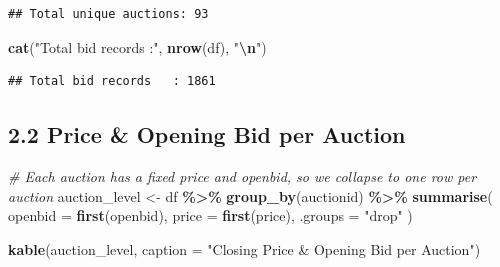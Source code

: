 \documentclass[
]{article}
\newenvironment{Shaded}{\begin{snugshade}}{\end{snugshade}}
\newcommand{\AttributeTok}[1]{\textcolor[rgb]{0.13,0.29,0.53}{#1}}
\newcommand{\CommentTok}[1]{\textcolor[rgb]{0.56,0.35,0.01}{\textit{#1}}}
\newcommand{\FunctionTok}[1]{\textcolor[rgb]{0.13,0.29,0.53}{\textbf{#1}}}
\newcommand{\NormalTok}[1]{#1}
\newcommand{\OtherTok}[1]{\textcolor[rgb]{0.56,0.35,0.01}{#1}}
\newcommand{\SpecialCharTok}[1]{\textcolor[rgb]{0.81,0.36,0.00}{\textbf{#1}}}
\newcommand{\StringTok}[1]{\textcolor[rgb]{0.31,0.60,0.02}{#1}}
\begin{document}
\begin{verbatim}
## Total unique auctions: 93
\end{verbatim}

\begin{Shaded}
\begin{Highlighting}[]
\FunctionTok{cat}\NormalTok{(}\StringTok{"Total bid records   :"}\NormalTok{, }\FunctionTok{nrow}\NormalTok{(df), }\StringTok{"}\SpecialCharTok{\textbackslash{}n}\StringTok{"}\NormalTok{)}
\end{Highlighting}
\end{Shaded}

\begin{verbatim}
## Total bid records   : 1861
\end{verbatim}

\subsection{2.2 Price \& Opening Bid per
Auction}\label{price-opening-bid-per-auction}

\begin{Shaded}
\begin{Highlighting}[]
\CommentTok{\# Each auction has a fixed price and openbid, so we collapse to one row per auction}
\NormalTok{auction\_level }\OtherTok{\textless{}{-}}\NormalTok{ df }\SpecialCharTok{\%\textgreater{}\%}
  \FunctionTok{group\_by}\NormalTok{(auctionid) }\SpecialCharTok{\%\textgreater{}\%}
  \FunctionTok{summarise}\NormalTok{(}
    \AttributeTok{openbid =} \FunctionTok{first}\NormalTok{(openbid),}
    \AttributeTok{price   =} \FunctionTok{first}\NormalTok{(price),}
    \AttributeTok{.groups =} \StringTok{"drop"}
\NormalTok{  )}

\FunctionTok{kable}\NormalTok{(auction\_level, }\AttributeTok{caption =} \StringTok{"Closing Price \& Opening Bid per Auction"}\NormalTok{)}
\end{Highlighting}
\end{Shaded}
\end{document}
